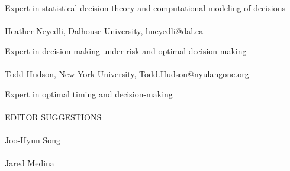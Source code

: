 \documentclass[12pt]{article}
\begin{document}
Expert in statistical decision theory and computational modeling of decisions
\\
\\
Heather Neyedli, Dalhouse University, hneyedli@dal.ca

Expert in decision-making under risk and optimal decision-making
\\
\\
Todd Hudson, New York University, Todd.Hudson@nyulangone.org

Expert in optimal timing and decision-making
\\
\\
\noindent \textcolor{myudblue}{EDITOR SUGGESTIONS}
\\
\\
Joo-Hyun Song
\\
\\
Jared Medina  
\end{document}
